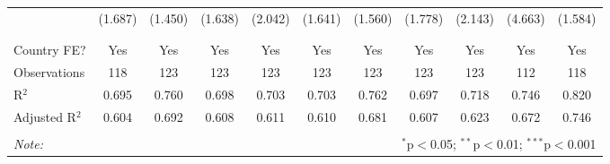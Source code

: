 \begin{table}[!htbp]
\begin{tabular}{@{\extracolsep{5pt}}lcccccccccc}
  & (1.687) & (1.450) & (1.638) & (2.042) & (1.641) & (1.560) & (1.778) & (2.143) & (4.663) & (1.584) \\ 
  & & & & & & & & & & \\ 
\hline \\[-1.8ex] 
Country FE? & Yes & Yes & Yes & Yes & Yes & Yes & Yes & Yes & Yes & Yes \\ 
Observations & 118 & 123 & 123 & 123 & 123 & 123 & 123 & 123 & 112 & 118 \\ 
R$^{2}$ & 0.695 & 0.760 & 0.698 & 0.703 & 0.703 & 0.762 & 0.697 & 0.718 & 0.746 & 0.820 \\ 
Adjusted R$^{2}$ & 0.604 & 0.692 & 0.608 & 0.611 & 0.610 & 0.681 & 0.607 & 0.623 & 0.672 & 0.746 \\ 
\hline 
\hline \\[-1.8ex] 
\textit{Note:}  & \multicolumn{10}{r}{$^{*}$p$<$0.05; $^{**}$p$<$0.01; $^{***}$p$<$0.001} \\ 
\end{tabular} 
\end{table} 
